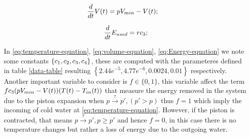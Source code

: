       \begin{equation}
        \frac{d}{dt}V(t) = pV_{min} - V(t); \quad
        \label{eq:volume-equation}
      \end{equation}

      \begin{equation} 
        \frac{d}{dt}E_{used} = r c_{3} ;
        \label{eq:Energy-equation}
      \end{equation}

      In \ref{eq:temperature-equation}, \ref{eq:volume-equation}, 
      \ref{eq:Energy-equation}  we note some constants $\left\lbrace 
      c_1, c_{2}, c_{3}, c_{4} \right\rbrace $, these
      are computed with the parameteres defined in table \ref{data-table} 
      resulting $\left\lbrace 2.44e^{-5},  4.77e^{-6}, 0.0024, 0.01 \right\rbrace$ 
      respectively. Another important variable to consider is $f \in 
      \lbrace 0,1 \rbrace$,
      this variable affect the term $fc_{3}(pV_{min}-V(t))(T(t)-T_{in}(t))$ 
      that measure the energy removed in the system due to the piston 
      expansion when $p \xrightarrow{\tau} p', (p'>p)$ thus $f=1$
      which imply the incoming of cold water at \autoref{eq:temperature-equation}.
      However, if the piston is contracted, that means 
      $p \xrightarrow{\tau} p', p \geqslant p'$ and hence $f=0$,
      in this case there is no temperature changes but rather a loss of 
      energy due to the outgoing water.
      \clearpage

